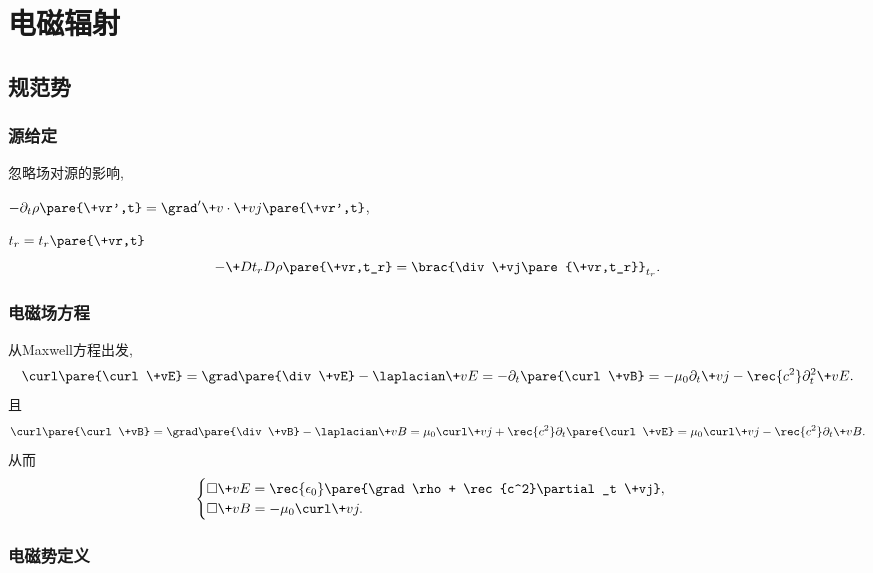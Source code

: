 \documentclass[hidelinks]{ctexart}
\begin{document}
\section{电磁辐射} %
\label{sec:电磁辐射}

\subsection{规范势} %
\label{sub:规范势}

\subsubsection{源给定} %
\label{ssub:源给定}

\begin{cenum}
    \item 忽略场对源的影响,
    \item $-\partial_t \rho\pare{\+vr',t} = \grad'\+v\cdot \+vj\pare{\+vr',t}$,
    \item $t_r = t_r\pare{\+vr,t}$
    \[ -\+D{t_r}D{\rho\pare{\+vr,t_r}} = \brac{\div \+vj\pare{\+vr,t_r}}_{t_r}. \]
\end{cenum}


\subsubsection{电磁场方程} %
\label{ssub:电磁场方程}

从Maxwell方程出发,
\[ \curl\pare{\curl \+vE} = \grad\pare{\div \+vE} - \laplacian \+vE = -\partial_t\pare{\curl \+vB} = -\mu_0 \partial_t \+vj - \rec{c^2}\partial_t^2 \+vE. \]
且
\[ \curl\pare{\curl \+vB} = \grad\pare{\div \+vB} - \laplacian \+vB = \mu_0 \curl \+vj + \rec{c^2}\partial_t \pare{\curl \+vE} = \mu_0 \curl \+vj - \rec{c^2}\partial_t \+vB. \]
从而
\[ \begin{cases}
    \displaystyle \Box{} \+vE = \rec{\epsilon_0} \pare{\grad \rho + \rec{c^2}\partial_t \+vj}, \\
    \displaystyle \Box{} \+vB = -\mu_0 \curl \+vj.
\end{cases} \]


\subsubsection{电磁势定义} %
\label{ssub:电磁势定义}
\end{document}
